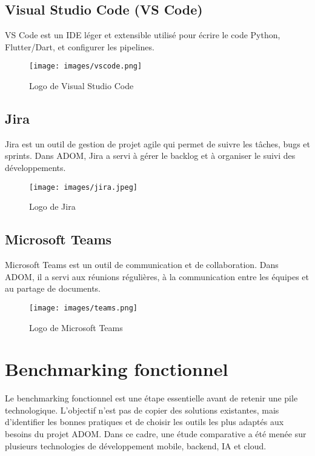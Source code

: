 \documentclass[12pt,a4paper]{report}
\begin{document}
\subsection{Visual Studio Code (VS Code)}
VS Code est un IDE léger et extensible utilisé pour écrire le code Python, Flutter/Dart,
et configurer les pipelines.
\begin{figure}[H]
    \centering
    \texttt{[image: images/vscode.png]}
    \caption{Logo de Visual Studio Code}
\end{figure}
\subsection{Jira}
Jira est un outil de gestion de projet agile qui permet de suivre les tâches, bugs et sprints.
Dans ADOM, Jira a servi à gérer le backlog et à organiser le suivi des développements.
\begin{figure}[H]
    \centering
    \texttt{[image: images/jira.jpeg]}
    \caption{Logo de Jira}
\end{figure}

\subsection{Microsoft Teams}
Microsoft Teams est un outil de communication et de collaboration.
Dans ADOM, il a servi aux réunions régulières, à la communication
entre les équipes et au partage de documents.
\begin{figure}[H]
    \centering
    \texttt{[image: images/teams.png]}
    \caption{Logo de Microsoft Teams}
\end{figure}
\cleardoublepage
\section{Benchmarking fonctionnel}

Le benchmarking fonctionnel est une étape essentielle avant de retenir une pile
technologique. L’objectif n’est pas de copier des solutions existantes, mais
d’identifier les bonnes pratiques et de choisir les outils les plus adaptés aux besoins
du projet ADOM.\@
Dans ce cadre, une étude comparative a été menée sur plusieurs technologies
de développement mobile, backend, IA et cloud.
\end{document}
